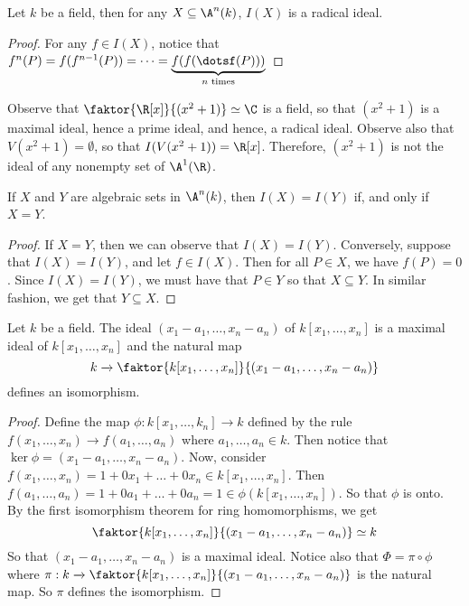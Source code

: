 \begin{lemma}\label{1.3.5}
    Let $k$ be a field, then for any $X \subseteq \A^n(k)$, $I(X)$ is a radical
    ideal.
\end{lemma}
\begin{proof}
    For any $f \in I(X)$, notice that $f^n(P)=f(f^{n-1}(P))=\dots=
    \underbrace{f(f(\dotsf(P)))}_{n\text{ times}}$
\end{proof}

\begin{example}\label{example_1.8}
    Observe that $\faktor{\R[x]}{(x^2+1)} \simeq \C$ is a field, so that
    $(x^2+1)$ is a maximal ideal, hence a prime ideal, and hence, a radical
    ideal. Observe also that $V(x^2+1)=\emptyset$, so that $I(V(x^2+1))=\R[x]$.
    Therefore, $(x^2+1)$ is not the ideal of any nonempty set of $\A^1(\R)$.
\end{example}

\begin{lemma}\label{1.3.6}
    If $X$ and $Y$ are algebraic sets in $\A^n(k)$, then $I(X)=I(Y)$ if, and
    only if $X=Y$.
\end{lemma}
\begin{proof}
    If $X=Y$, then we can observe that $I(X)=I(Y)$. Conversely, suppose that
    $I(X)=I(Y)$, and let $f \in I(X)$. Then for all $P \in X$, we have $f(P)=0$.
    Since $I(X)=I(Y)$, we must have that $P \in Y$ so that $X \subseteq Y$. In
    similar fashion, we get that $Y \subseteq X$.
\end{proof}

\begin{theorem}\label{1.3.7}
    Let $k$ be a field. The ideal $(x_1-a_1, \dots, x_n-a_n)$ of
    $k[x_1, \dots, x_n]$ is a maximal ideal of $k[x_1, \dots, x_n]$ and the
    natural map
    \begin{equation*}
        k \xrightarrow{} \faktor{k[x_1, \dots, x_n]}{(x_1-a_1, \dots, x_n-a_n)}
    \end{equation*}
    defines an isomorphism.
\end{theorem}
\begin{proof}
    Define the map $\phi:k[x_1, \dots, k_n] \xrightarrow{} k$ defined by the
    rule $f(x_1, \dots, x_n) \xrightarrow{} f(a_1, \dots, a_n)$ where $a_1,
    \dots, a_n \in k$. Then notice that $\ker{\phi}=(x_1-a_1, \dots ,x_n-a_n)$.
    Now, consider $f(x_1, \dots, x_n)=1+0x_1+\dots+0x_n \in k[x_1, \dots, x_n]$.
    Then $f(a_1,\dots,a_n)=1+0a_1+\dots+0a_n=1 \in \phi(k[x_1, \dots, x_n])$. So
    that $\phi$ is onto. By the first isomorphism theorem for ring
    homomorphisms, we get
    \begin{equation*}
        \faktor{k[x_1, \dots, x_n]}{(x_1-a_1, \dots, x_n-a_n)} \simeq k
    \end{equation*}
    So that $(x_1-a_1, \dots, x_n-a_n)$ is a maximal ideal. Notice also that
    $\Phi=\pi \circ \phi$ where $\pi:k \xrightarrow{}
    \faktor{k[x_1, \dots, x_n]}{(x_1-a_1, \dots, x_n-a_n)}$ is the natural map.
    So $\pi$ defines the isomorphism.
\end{proof}
